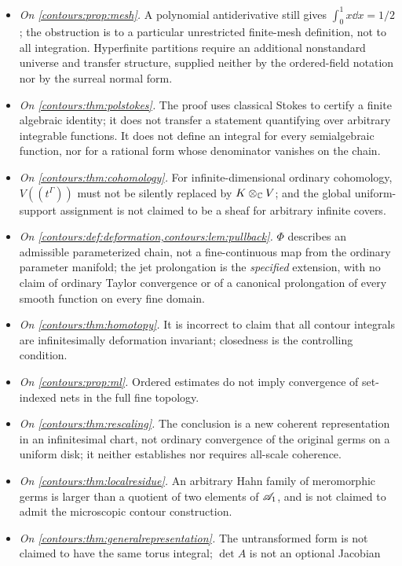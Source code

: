 \documentclass[11pt,letterpaper]{article}
\theoremstyle{definition}
\theoremstyle{remark}
\numberwithin{equation}{section}
\begin{document}
\begin{itemize}
\item \emph{On \cref{contours:prop:mesh}.} A polynomial antiderivative still gives
$\int_0^1x\dd x=1/2$; the obstruction is to a particular unrestricted finite-mesh
definition, not to all integration. Hyperfinite partitions require an additional
nonstandard universe and transfer structure, supplied neither by the ordered-field
notation nor by the surreal normal form.
\item \emph{On \cref{contours:thm:polstokes}.} The proof uses classical Stokes to
certify a finite algebraic identity; it does not transfer a statement quantifying over
arbitrary integrable functions. It does not define an integral for every semialgebraic
function, nor for a rational form whose denominator vanishes on the chain.
\item \emph{On \cref{contours:thm:cohomology}.} For infinite-dimensional ordinary
cohomology, $V((t^\Gamma))$ must not be silently replaced by $K\otimes_\mathbb C V$; and the
global uniform-support assignment is not claimed to be a sheaf for arbitrary infinite
covers.
\item \emph{On \cref{contours:def:deformation,contours:lem:pullback}.} $\Phi$ describes
an admissible parameterized chain, not a fine-continuous map from the ordinary
parameter manifold; the jet prolongation is the \emph{specified} extension, with no
claim of ordinary Taylor convergence or of a canonical prolongation of every smooth
function on every fine domain.
\item \emph{On \cref{contours:thm:homotopy}.} It is incorrect to claim that all contour
integrals are infinitesimally deformation invariant; closedness is the controlling
condition.
\item \emph{On \cref{contours:prop:ml}.} Ordered estimates do not imply convergence of
set-indexed nets in the full fine topology.
\item \emph{On \cref{contours:thm:rescaling}.} The conclusion is a new coherent
representation in an infinitesimal chart, not ordinary convergence of the original
germs on a uniform disk; it neither establishes nor requires all-scale coherence.
\item \emph{On \cref{contours:thm:localresidue}.} An arbitrary Hahn family of
meromorphic germs is larger than a quotient of two elements of $\mathscr A_1$, and is not
claimed to admit the microscopic contour construction.
\item \emph{On \cref{contours:thm:generalrepresentation}.} The untransformed form is
not claimed to have the same torus integral; $\det A$ is not an optional Jacobian

\end{itemize}
\end{document}
